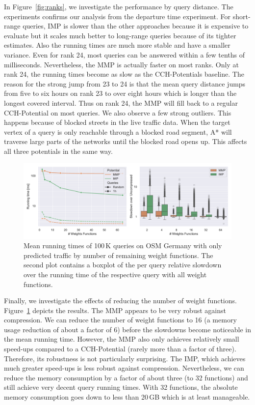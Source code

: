 \documentclass[a4paper,UKenglish,cleveref, autoref, thm-restate,anonymous]{lipics-v2021}
\begin{document}
In Figure~\ref{fig:ranks}, we investigate the performance by query distance.
The experiments confirms our analysis from the departure time experiment.
For short-range queries, IMP is slower than the other approaches because it is expensive to evaluate but it scales much better to long-range queries because of its tighter estimates.
Also the running times are much more stable and have a smaller variance.
Even for rank 24, most queries can be answered within a few tenths of milliseconds.
Nevertheless, the MMP is actually faster on most ranks.
Only at rank 24, the running times become as slow as the CCH-Potentials baseline.
The reason for the strong jump from 23 to 24 is that the mean query distance jumps from five to six hours on rank 23 to over eight hours which is longer than the longest covered interval.
Thus on rank 24, the MMP will fill back to a regular CCH-Potential on most queries.
We also observe a few strong outliers.
This happens because of blocked streets in the live traffic data.
When the target vertex of a query is only reachable through a blocked road segment, A* will traverse large parts of the networks until the blocked road opens up.
This affects all three potentials in the same way.

\begin{figure}[tbh]
\centering
\includegraphics[width=\linewidth]{fig/compression.pdf}
\caption{
Mean running times of 100\,K queries on OSM Germany with only predicted traffic by number of remaining weight functions.
The second plot contains a boxplot of the per query relative slowdown over the running time of the respective query with all weight functions.
}\label{fig:compression}
\end{figure}

Finally, we investigate the effects of reducing the number of weight functions.
Figure~\ref{fig:compression} depicts the results.
The MMP appears to be very robust against compression.
We can reduce the number of weight functions to 16 (a memory usage reduction of about a factor of 6) before the slowdowns become noticeable in the mean running time.
However, the MMP also only achieves relatively small speed-ups compared to a CCH-Potential (rarely more than a factor of three).
Therefore, its robustness is not particularly surprising.
The IMP, which achieves much greater speed-ups is less robust against compression.
Nevertheless, we can reduce the memory consumption by a factor of about three (to 32 functions) and still achieve very decent query running times.
With 32 functions, the absolute memory consumption goes down to less than 20\,GB which is at least manageable.
\end{document}
